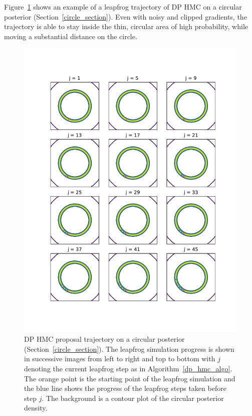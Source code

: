 \documentclass[english,twoside,openright]{HYgraduMLDS}
\begin{document}
Figure~\ref{hmc_trajectory_fig} shows an example of a leapfrog trajectory
of DP HMC on a circular posterior (Section~\ref{circle_section}).
Even with noisy and clipped gradients,
the trajectory is able to stay inside the thin, circular area of high probability,
while moving a substantial distance on the circle.

\begin{figure}[h]
	\centering
  \includegraphics[width=\textwidth]{figures/hmc_trajectory}
  \caption{
    DP HMC proposal trajectory on a circular posterior
    (Section~\ref{circle_section}). The leapfrog simulation progress is shown
    in successive images from left to right and top to bottom with \(j\) denoting
    the current leapfrog step as in Algorithm~\ref{dp_hmc_algo}.
    The orange point is the starting
    point of the leapfrog simulation and the blue line shows the progress
    of the leapfrog steps taken before step \(j\).
    The background is a contour plot of the circular posterior density.
  }
  \label{hmc_trajectory_fig}
\end{figure}
\end{document}
